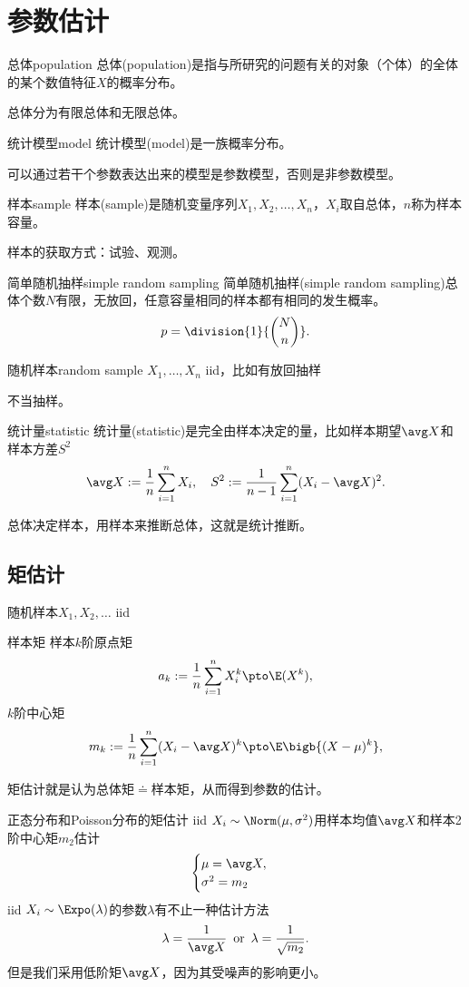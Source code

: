 \chapter{参数估计}

\begin{definition}{总体}{population}
	总体(population)是指与所研究的问题有关的对象（个体）的全体的某个数值特征$X$的概率分布。
\end{definition}
总体分为有限总体和无限总体。
\begin{definition}{统计模型}{model}
	统计模型(model)是一族概率分布。
\end{definition}
可以通过若干个参数表达出来的模型是参数模型，否则是非参数模型。
\begin{definition}{样本}{sample}
	样本(sample)是随机变量序列$X_1,X_2,\ldots,X_n$，$X_i$取自总体，$n$称为样本容量。
\end{definition}
样本的获取方式：试验、观测。
\begin{definition}{简单随机抽样}{simple random sampling}
	简单随机抽样(simple random sampling)总体个数$N$有限，无放回，任意容量相同的样本都有相同的发生概率。
	\[
		p=\division{1}{\binom Nn}.
	\]
\end{definition}
\begin{definition}{随机样本}{random sample}
	$X_1,\ldots,X_n$ iid，比如有放回抽样
\end{definition}
不当抽样。
\begin{definition}{统计量}{statistic}
	统计量(statistic)是完全由样本决定的量，比如样本期望$\avg X$和样本方差$S^2$
	\[
		\avg X:=\frac1n\sum_{i=1}^nX_i,\quad S^2:=\frac1{n-1}\sum_{i=1}^n(X_i-\avg X)^2.
	\]
\end{definition}
总体决定样本，用样本来推断总体，这就是统计推断。
\section{矩估计}
随机样本$X_1,X_2,\ldots$ iid
\begin{definition}{样本矩}{}
	样本$k$阶原点矩
	\[
		a_k:=\frac1n\sum_{i=1}^nX_i^k\pto\E(X^k),
	\]
	$k$阶中心矩
	\[
		m_k:=\frac1n\sum_{i=1}^n(X_i-\avg X)^k\pto\E\bigb{(X-\mu)^k},
	\]
\end{definition}
矩估计就是认为总体矩$\doteq$样本矩，从而得到参数的估计。
\begin{example}{正态分布和Poisson分布的矩估计}{}
	iid $X_i\sim\Norm(\mu,\sigma^2)$用样本均值$\avg X$和样本2阶中心矩$m_2$估计
	\[
		\begin{cases}
			\mu=\avg X,\\
			\sigma^2=m_2
		\end{cases}
	\]
	\tcblower
	iid $X_i\sim\Expo(\lambda)$的参数$\lambda$有不止一种估计方法
	\[
		\lambda=\frac1{\avg X}\enspace\text{or}\enspace\lambda=\frac1{\sqrt{m_2}}.
	\]
	但是我们采用低阶矩$\avg X$，因为其受噪声的影响更小。
\end{example}
